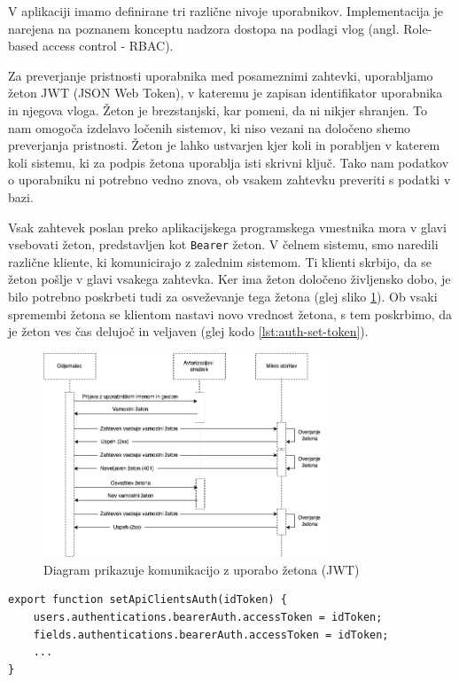 \documentclass[a4paper, 12pt]{book}
\begin{document}
V aplikaciji imamo definirane tri različne nivoje uporabnikov. Implementacija je narejena na poznanem konceptu nadzora dostopa na podlagi vlog (angl. Role-based access control - RBAC).

Za preverjanje pristnosti uporabnika med posameznimi zahtevki, uporabljamo žeton JWT (JSON Web Token), v kateremu je zapisan identifikator uporabnika in njegova vloga. Žeton je brezstanjski, kar pomeni, da ni nikjer shranjen. To nam omogoča izdelavo ločenih sistemov, ki niso vezani na določeno shemo preverjanja pristnosti. Žeton je lahko ustvarjen kjer koli in porabljen v katerem koli sistemu, ki za podpis žetona uporablja isti skrivni ključ. Tako nam podatkov o uporabniku ni potrebno vedno znova, ob vsakem zahtevku preveriti s podatki v bazi.

Vsak zahtevek poslan preko aplikacijskega programskega vmestnika mora v glavi vsebovati žeton, predstavljen kot \verb=Bearer= žeton. V čelnem sistemu, smo naredili različne kliente, ki komunicirajo z zalednim sistemom. Ti klienti skrbijo, da se žeton pošlje v glavi vsakega zahtevka. Ker ima žeton določeno življensko dobo, je bilo potrebno poskrbeti tudi za osveževanje tega žetona (glej sliko \ref{token-flow}). Ob vsaki spremembi žetona se klientom nastavi novo vrednost žetona, s tem poskrbimo, da je žeton ves čas delujoč in veljaven (glej kodo \ref{lst:auth-set-token}).

\begin{figure}[h]
\begin{center}
\includegraphics[width=0.75\textwidth]{slike/token-flow.png}
\end{center}
\caption{ Diagram prikazuje komunikacijo z uporabo žetona (JWT) }
\label{token-flow}
\end{figure}


\begin{lstlisting}[style=mystyle,caption={Izsek kode za nastavljanje žetona posameznemu klentu},label=lst:auth-set-token]
export function setApiClientsAuth(idToken) {
    users.authentications.bearerAuth.accessToken = idToken;
    fields.authentications.bearerAuth.accessToken = idToken;
    ...
}
\end{lstlisting}
\end{document}
